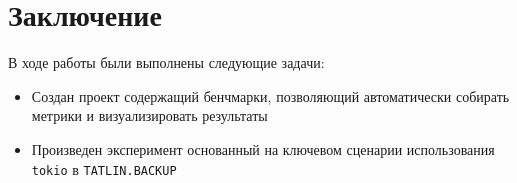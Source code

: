 
\section{Заключение}

В ходе работы были выполнены следующие задачи:

\begin{itemize}
    \item Создан проект содержащий бенчмарки, позволяющий автоматически собирать метрики и визуализировать результаты
    \item Произведен эксперимент основанный на ключевом сценарии использования \verb|tokio| в \verb|TATLIN.BACKUP|
\end{itemize}
